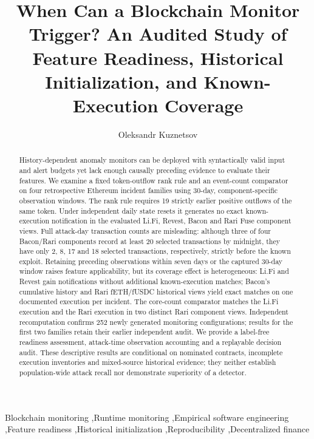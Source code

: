 \documentclass[preprint,12pt,authoryear]{elsarticle}
\begin{document}
\begin{frontmatter}
\title{When Can a Blockchain Monitor Trigger? An Audited Study of Feature Readiness, Historical Initialization, and Known-Execution Coverage}
\author[aff1,aff2]{Oleksandr Kuznetsov}
\address[aff1]{Department of Theoretical and Applied Sciences, eCampus University, Italy}
\address[aff2]{Department of Intelligent Software Systems and Technologies, School of Computer Science and Artificial Intelligence, V.~N. Karazin Kharkiv National University, Ukraine}
\begin{abstract}
History-dependent anomaly monitors can be deployed with syntactically valid input and alert budgets yet lack enough causally preceding evidence to evaluate their features. We examine a fixed token-outflow rank rule and an event-count comparator on four retrospective Ethereum incident families using 30-day, component-specific observation windows. The rank rule requires 19 strictly earlier positive outflows of the same token. Under independent daily state resets it generates no exact known-execution notification in the evaluated Li.Fi, Revest, Bacon and Rari Fuse component views. Full attack-day transaction counts are misleading: although three of four Bacon/Rari components record at least 20 selected transactions by midnight, they have only 2, 8, 17 and 18 selected transactions, respectively, strictly before the known exploit. Retaining preceding observations within seven days or the captured 30-day window raises feature applicability, but its coverage effect is heterogeneous: Li.Fi and Revest gain notifications without additional known-execution matches; Bacon's cumulative history and Rari fETH/fUSDC historical views yield exact matches on one documented execution per incident. The core-count comparator matches the Li.Fi execution and the Rari execution in two distinct Rari component views. Independent recomputation confirms 252 newly generated monitoring configurations; results for the first two families retain their earlier independent audit. We provide a label-free readiness assessment, attack-time observation accounting and a replayable decision audit. These descriptive results are conditional on nominated contracts, incomplete execution inventories and mixed-source historical evidence; they neither establish population-wide attack recall nor demonstrate superiority of a detector.
\end{abstract}
\begin{keyword}
Blockchain monitoring \sep Runtime monitoring \sep Empirical software engineering \sep Feature readiness \sep Historical initialization \sep Reproducibility \sep Decentralized finance
\end{keyword}
\end{frontmatter}
\end{document}
